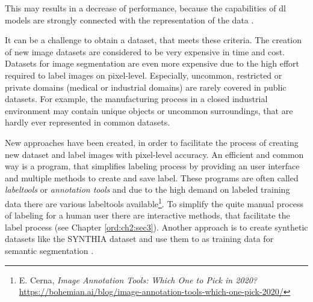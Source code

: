 \begin{itemize}
	This may results in a decrease of performance, because the capabilities of \gls{dl} models are strongly connected with the representation of the data \cite{Goodfellow-et-al-2016}.
\end{itemize} 
It can be a challenge to obtain a dataset, that meets these criteria.
The creation of new image datasets are considered to be very expensive in time and cost.
Datasets for image segmentation are even more expensive due to the high effort required to label images on pixel-level.
Especially, uncommon, restricted or private domains (\eg medical or industrial domains) are rarely covered in public datasets.
For example, the manufacturing process in a closed industrial environment may contain unique objects or uncommon surroundings, that are hardly ever represented in common datasets.

New approaches have been created, in order to facilitate the process of creating new dataset and label images with pixel-level accuracy.
An efficient and common way is a program, that simplifies labeling process by providing an user interface and multiple methods to create and save label.
These programs are often called \textit{labeltools} or \textit{annotation tools} and due to the high demand on labeled training data there are various labeltools available\footnote{E. Cerna, \textit{Image Annotation Tools: Which One to Pick in 2020?} \url{https://bohemian.ai/blog/image-annotation-tools-which-one-pick-2020/}}.
To simplify the quite manual process of labeling for a human user there are interactive methods, that facilitate the label process (see Chapter \ref{ord:ch2:sec3}).
Another approach is to create synthetic datasets like the SYNTHIA dataset \cite{Zol19-Temporal} and use them to as training data for semantic segmentation \cite{Chen18-SyntheticData}.


